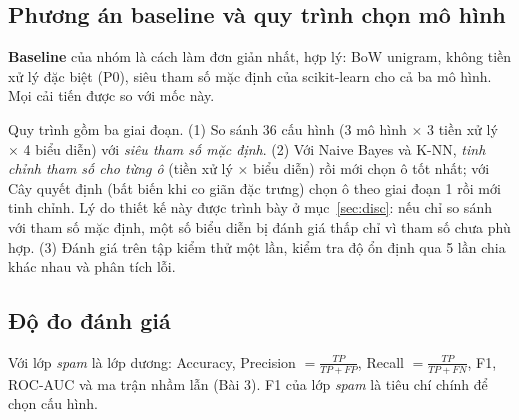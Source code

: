 \documentclass[12pt,a4paper]{article}
\newcommand{\spam}{\textit{spam}}
\begin{document}
\subsection{Phương án baseline và quy trình chọn mô hình}
\textbf{Baseline} của nhóm là cách làm đơn giản nhất, hợp lý: BoW unigram, không tiền xử lý đặc biệt (P0), siêu tham số mặc định của scikit-learn cho cả ba mô hình. Mọi cải tiến được so với mốc này.

Quy trình gồm ba giai đoạn. (1) So sánh 36 cấu hình (3 mô hình $\times$ 3 tiền xử lý $\times$ 4 biểu diễn) với \emph{siêu tham số mặc định}. (2) Với Naive Bayes và K-NN, \emph{tinh chỉnh tham số cho từng ô} (tiền xử lý $\times$ biểu diễn) rồi mới chọn ô tốt nhất; với Cây quyết định (bất biến khi co giãn đặc trưng) chọn ô theo giai đoạn 1 rồi mới tinh chỉnh. Lý do thiết kế này được trình bày ở mục~\ref{sec:disc}: nếu chỉ so sánh với tham số mặc định, một số biểu diễn bị đánh giá thấp chỉ vì tham số chưa phù hợp. (3) Đánh giá trên tập kiểm thử một lần, kiểm tra độ ổn định qua 5 lần chia khác nhau và phân tích lỗi.

\subsection{Độ đo đánh giá}
Với lớp \spam{} là lớp dương: Accuracy, Precision $=\frac{TP}{TP+FP}$, Recall $=\frac{TP}{TP+FN}$, F1, ROC-AUC và ma trận nhầm lẫn (Bài 3). F1 của lớp \spam{} là tiêu chí chính để chọn cấu hình.

\end{document}
